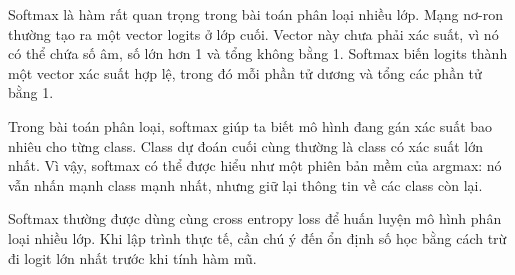 Softmax là hàm rất quan trọng trong bài toán phân loại nhiều lớp. Mạng nơ-ron thường tạo ra một vector logits ở lớp cuối. Vector này chưa phải xác suất, vì nó có thể chứa số âm, số lớn hơn 1 và tổng không bằng 1. Softmax biến logits thành một vector xác suất hợp lệ, trong đó mỗi phần tử dương và tổng các phần tử bằng 1.

Trong bài toán phân loại, softmax giúp ta biết mô hình đang gán xác suất bao nhiêu cho từng class. Class dự đoán cuối cùng thường là class có xác suất lớn nhất. Vì vậy, softmax có thể được hiểu như một phiên bản mềm của argmax: nó vẫn nhấn mạnh class mạnh nhất, nhưng giữ lại thông tin về các class còn lại.

Softmax thường được dùng cùng cross entropy loss để huấn luyện mô hình phân loại nhiều lớp. Khi lập trình thực tế, cần chú ý đến ổn định số học bằng cách trừ đi logit lớn nhất trước khi tính hàm mũ.

